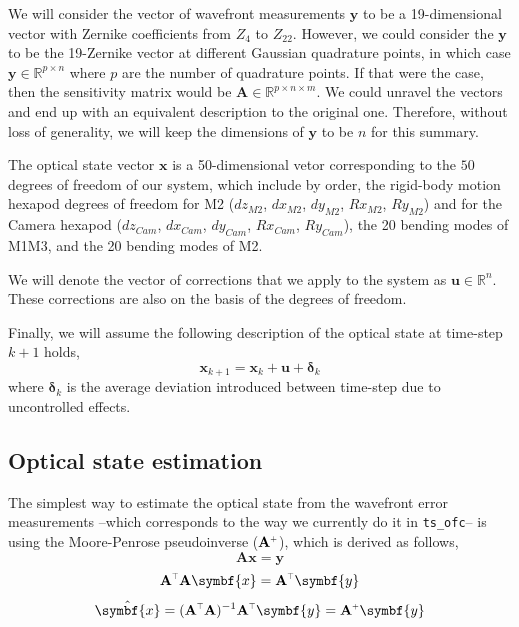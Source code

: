 \documentclass[SE,authoryear,toc]{lsstdoc}
\renewcommand{\v}[1]{\mathbf{#1}}
\newcommand{\plus}{\scalebox{0.6}{$+$}}
\newcommand{\tr}{\scalebox{0.6}{$\top$}}
\begin{document}
We will consider the vector of wavefront measurements $\symbf{y}$ to be a 19-dimensional vector with Zernike coefficients from $Z_4$ to $Z_{22}$. However, we could consider the $\symbf{y}$ to be the 19-Zernike vector at different Gaussian quadrature points, in which case $\symbf{y} \in \mathbb{R}^{p \times n}$ where $p$ are the number of quadrature points. If that were the case, then the sensitivity matrix would be $\v{A} \in \mathbb{R}^{p \times n \times m}$. We could unravel the vectors and end up with an equivalent description to the original one. Therefore, without loss of generality, we will keep the dimensions of $\symbf{y}$ to be $n$ for this summary.

The optical state vector  $\symbf{x}$ is a 50-dimensional vetor corresponding to the $50$ degrees of freedom of our system, which include by order, the rigid-body motion hexapod degrees of freedom for M2 ($dz_{M2}$, $dx_{M2}$, $dy_{M2}$, $Rx_{M2}$, $Ry_{M2}$) and for the Camera hexapod ($dz_{Cam}$, $dx_{Cam}$, $dy_{Cam}$, $Rx_{Cam}$, $Ry_{Cam}$), the 20 bending modes of M1M3, and the 20 bending modes of M2. 

We will denote the vector of corrections that we apply to the system as $\symbf{u} \in \mathbb{R}^n$. These corrections are also on the basis of the degrees of freedom.

Finally, we will assume the following description of the optical state at time-step $k + 1$ holds, 
\begin{equation}\label{eq3}
    \symbf{x}_{k + 1} = \symbf{x}_{k} + \symbf{u} + \symbf{\delta}_{k}
\end{equation}
where $\symbf{\delta}_{k}$ is the average deviation introduced between time-step due to uncontrolled effects.

\subsection*{Optical state estimation}
The simplest way to estimate the optical state from the wavefront error measurements --which corresponds to the way we currently do it in \texttt{ts\_ofc}-- is using the Moore-Penrose pseudoinverse ($\v{A}^{\plus}$), which is derived as follows,
\begin{equation*}
     \v{A}\symbf{x} = \symbf{y}
\end{equation*}
\begin{equation*}
     \v{A}^{\tr}\v{A}\symbf{x} = \v{A}^{\tr}\symbf{y}
\end{equation*}
\begin{equation*}
    \hat{\symbf{x}} = (\v{A}^{\tr} \v{A})^{-1}\v{A}^{\tr}\symbf{y} = \v{A}^{\plus}\symbf{y}
\end{equation*}
\end{document}
